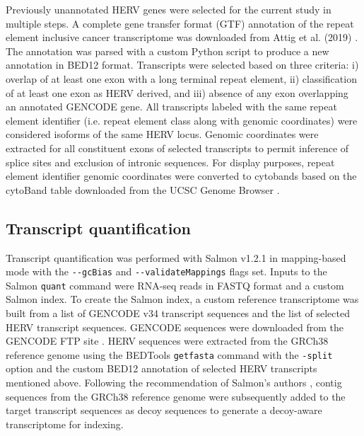 Previously unannotated HERV genes were selected for the current study in multiple steps.
A complete gene transfer format (GTF) \citep{GTF} annotation of the repeat element inclusive cancer transcriptome was downloaded from Attig et al. (2019) \citep{Attig2019}.
The annotation was parsed with a custom Python script to produce a new annotation in BED12 \citep{BED12} format.
Transcripts were selected based on three criteria: i) overlap of at least one exon with a long terminal repeat element, ii) classification of at least one exon as HERV derived, and iii) absence of any exon overlapping an annotated GENCODE gene.
All transcripts labeled with the same repeat element identifier (i.e. repeat element class along with genomic coordinates) were considered isoforms of the same HERV locus.
Genomic coordinates were extracted for all constituent exons of selected transcripts to permit inference of splice sites and exclusion of intronic sequences.
For display purposes, repeat element identifier genomic coordinates were converted to cytobands based on the cytoBand table downloaded from the UCSC Genome Browser \citep{Furey2003, Navarro2020}.

\subsection*{Transcript quantification}
Transcript quantification was performed with Salmon v1.2.1 \citep{Patro2017} in mapping-based mode with the \verb|--gcBias| and \verb|--validateMappings| flags set.
Inputs to the Salmon \verb|quant| command were RNA-seq reads in FASTQ format and a custom Salmon index.
To create the Salmon index, a custom reference transcriptome was built from a list of GENCODE v34  transcript sequences \citep{Frankish2018} and the list of selected HERV transcript sequences.
GENCODE sequences were downloaded from the GENCODE FTP site \citep{GENCODE-transcripts}.
HERV sequences were extracted from the GRCh38 reference genome \citep{ENCODE-GRCh38} using the BEDTools \verb|getfasta| command \citep{Quinlan2010} with the \verb|-split| option and the custom BED12 annotation of selected HERV transcripts mentioned above.
Following the recommendation of Salmon's authors \citep{SalmonDecoys}, contig sequences from the GRCh38 reference genome were subsequently added to the target transcript sequences as decoy sequences to generate a decoy-aware transcriptome for indexing.

